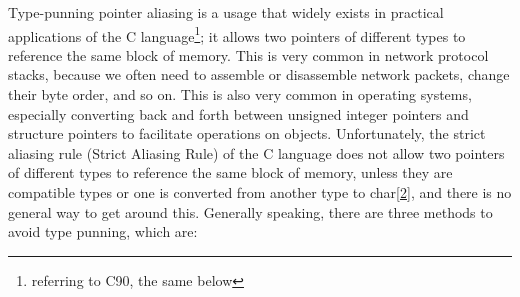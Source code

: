 Type-punning pointer aliasing is a usage that widely exists in practical applications of the C language\footnote{referring to C90, the same below}; it allows two pointers of different types to reference the same block of memory. This is very common in network protocol stacks, because we often need to assemble or disassemble network packets, change their byte order, and so on. This is also very common in operating systems, especially converting back and forth between unsigned integer pointers and structure pointers to facilitate operations on objects. Unfortunately, the strict aliasing rule (Strict
Aliasing
Rule) of the C language does not allow two pointers of different types to reference the same block of memory, unless they are compatible types or one is converted from another type to char\hyperref[cite:9-2]{{[}2{]}}, and there is no general way to get around this. Generally speaking, there are three methods to avoid type punning, which are:

